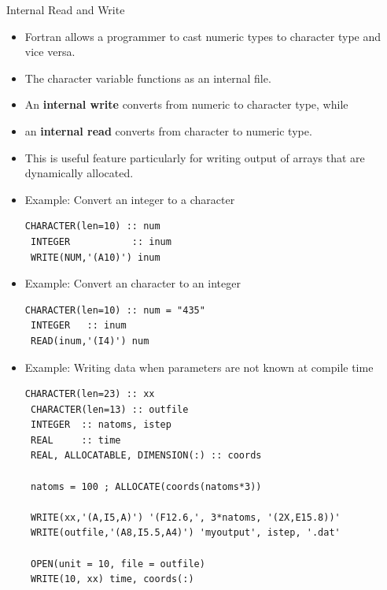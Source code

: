 \documentclass[10pt,t]{beamer}
\begin{document}
\begin{frame}{Internal Read and Write}
  \begin{itemize}
    \item Fortran allows a programmer to cast numeric types to character type and vice versa.
    \item The character variable functions as an internal file.
    \item An \textbf{internal write} converts from numeric to character type, while
    \item an \textbf{internal read} converts from character to numeric type.
    \item This is useful feature particularly for writing output of arrays that are dynamically allocated.
    \item Example: Convert an integer to a character
      \begin{lstlisting}[language={[90]Fortran}]
 CHARACTER(len=10) :: num
 INTEGER           :: inum
 WRITE(NUM,'(A10)') inum
      \end{lstlisting}
      \framebreak
    \item Example: Convert an character to an integer
      \begin{lstlisting}[language={[90]Fortran}]
 CHARACTER(len=10) :: num = "435"
 INTEGER   :: inum
 READ(inum,'(I4)') num
      \end{lstlisting}
    \item Example: Writing data when parameters are not known at compile time
      \begin{lstlisting}[language={[90]Fortran}]
 CHARACTER(len=23) :: xx
 CHARACTER(len=13) :: outfile
 INTEGER  :: natoms, istep
 REAL     :: time
 REAL, ALLOCATABLE, DIMENSION(:) :: coords

 natoms = 100 ; ALLOCATE(coords(natoms*3))

 WRITE(xx,'(A,I5,A)') '(F12.6,', 3*natoms, '(2X,E15.8))'
 WRITE(outfile,'(A8,I5.5,A4)') 'myoutput', istep, '.dat'

 OPEN(unit = 10, file = outfile)
 WRITE(10, xx) time, coords(:)
      \end{lstlisting}
  \end{itemize}
\end{frame}
\end{document}
